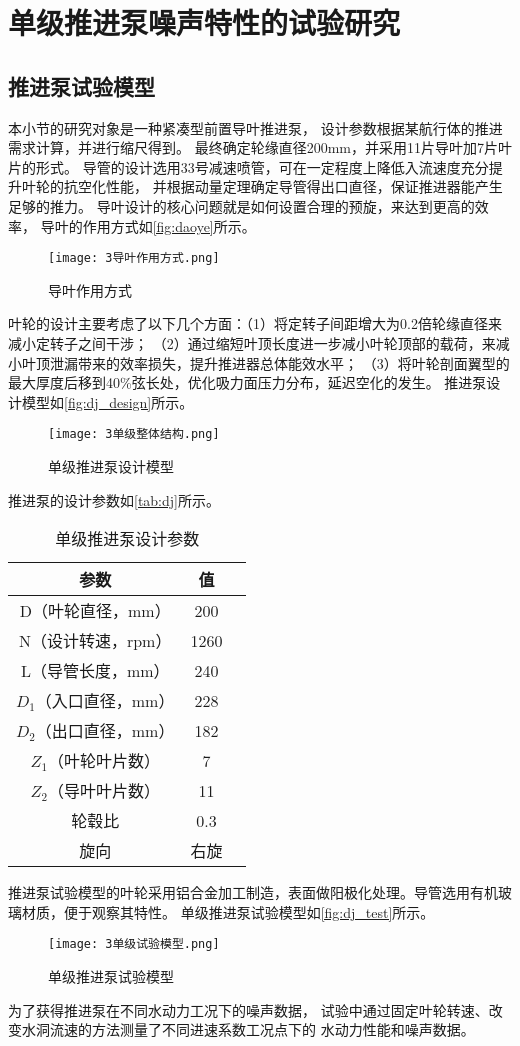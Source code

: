 \section{单级推进泵噪声特性的试验研究}
\subsection{推进泵试验模型}
本小节的研究对象是一种紧凑型前置导叶推进泵，
设计参数根据某航行体的推进需求计算，并进行缩尺得到。
最终确定轮缘直径200mm，并采用11片导叶加7片叶片的形式。
导管的设计选用33号减速喷管，可在一定程度上降低入流速度充分提升叶轮的抗空化性能，
并根据动量定理确定导管得出口直径，保证推进器能产生足够的推力。
导叶设计的核心问题就是如何设置合理的预旋，来达到更高的效率，
导叶的作用方式如\autoref{fig:daoye}所示。
\begin{figure}[htbp]
    \centering
    \texttt{[image: 3导叶作用方式.png]}
    \caption{\label{fig:daoye}导叶作用方式}
\end{figure}
叶轮的设计主要考虑了以下几个方面：（1）将定转子间距增大为0.2倍轮缘直径来减小定转子之间干涉；
（2）通过缩短叶顶长度进一步减小叶轮顶部的载荷，来减小叶顶泄漏带来的效率损失，提升推进器总体能效水平；
（3）将叶轮剖面翼型的最大厚度后移到40\%弦长处，优化吸力面压力分布，延迟空化的发生。
推进泵设计模型如\autoref{fig:dj_design}所示。
\begin{figure}[htbp]
    \centering
    \texttt{[image: 3单级整体结构.png]}
    \caption{\label{fig:dj_design}单级推进泵设计模型}
\end{figure}

推进泵的设计参数如\autoref{tab:dj}所示。
\begin{table}[htbp]
    \centering
    \caption{\label{tab:dj}单级推进泵设计参数}
    \begin{tabular}{ccc}
     \toprule
     参数&值\\
     \midrule
     D（叶轮直径，mm）&200\\
     N（设计转速，rpm）&1260\\
     L（导管长度，mm）&240\\
     $D_1$（入口直径，mm）&228\\
     $D_2$（出口直径，mm）&182\\
     $Z_1$（叶轮叶片数）&7\\
     $Z_2$（导叶叶片数）&11\\
     轮毂比&0.3\\
     旋向&右旋\\
     \bottomrule
    \end{tabular}
\end{table}
推进泵试验模型的叶轮采用铝合金加工制造，表面做阳极化处理。导管选用有机玻璃材质，便于观察其特性。
单级推进泵试验模型如\autoref{fig:dj_test}所示。
\begin{figure}[htbp]
    \centering
    \texttt{[image: 3单级试验模型.png]}
    \caption{\label{fig:dj_test}单级推进泵试验模型}
\end{figure}
为了获得推进泵在不同水动力工况下的噪声数据，
试验中通过固定叶轮转速、改变水洞流速的方法测量了不同进速系数工况点下的
水动力性能和噪声数据。

